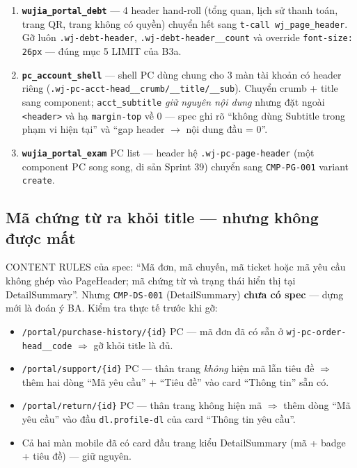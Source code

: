\begin{enumerate}
\item \textbf{\texttt{wujia\_portal\_debt}} --- 4 header hand-roll (tổng quan, lịch sử thanh
  toán, trang QR, trang không có quyền) chuyển hết sang \texttt{t-call wj\_page\_header}.
  Gỡ luôn \texttt{.wj-debt-header}, \texttt{.wj-debt-header\_\_count} và override
  \texttt{font-size: 26px} --- đúng mục 5 LIMIT của B3a.
\item \textbf{\texttt{pc\_account\_shell}} --- shell PC dùng chung cho 3 màn tài khoản có
  header riêng (\texttt{.wj-pc-acct-head\_\_crumb/\_\_title/\_\_sub}). Chuyển crumb + title
  sang component; \texttt{acct\_subtitle} \emph{giữ nguyên nội dung} nhưng đặt ngoài
  \texttt{<header>} và hạ \texttt{margin-top} về 0 --- spec ghi rõ ``không dùng Subtitle
  trong phạm vi hiện tại'' và ``gap header $\to$ nội dung đầu = 0''.
\item \textbf{\texttt{wujia\_portal\_exam}} PC list --- header hệ \texttt{.wj-pc-page-header}
  (một component PC song song, di sản Sprint 39) chuyển sang \texttt{CMP-PG-001} variant
  \texttt{create}.
\end{enumerate}

\subsection{Mã chứng từ ra khỏi title --- nhưng không được mất}

CONTENT RULES của spec: ``Mã đơn, mã chuyến, mã ticket hoặc mã yêu cầu không ghép vào
PageHeader; mã chứng từ và trạng thái hiển thị tại DetailSummary''. Nhưng \texttt{CMP-DS-001}
(DetailSummary) \textbf{chưa có spec} --- dựng mới là đoán ý BA. Kiểm tra thực tế trước khi gỡ:

\begin{itemize}
\item \texttt{/portal/purchase-history/\{id\}} PC --- mã đơn đã có sẵn ở
  \texttt{wj-pc-order-head\_\_code} $\Rightarrow$ gỡ khỏi title là đủ.
\item \texttt{/portal/support/\{id\}} PC --- thân trang \emph{không} hiện mã lẫn tiêu đề
  $\Rightarrow$ thêm hai dòng ``Mã yêu cầu'' + ``Tiêu đề'' vào card ``Thông tin'' sẵn có.
\item \texttt{/portal/return/\{id\}} PC --- thân trang không hiện mã $\Rightarrow$ thêm dòng
  ``Mã yêu cầu'' vào đầu \texttt{dl.profile-dl} của card ``Thông tin yêu cầu''.
\item Cả hai màn mobile đã có card đầu trang kiểu DetailSummary (mã + badge + tiêu đề) --- giữ nguyên.
\end{itemize}

